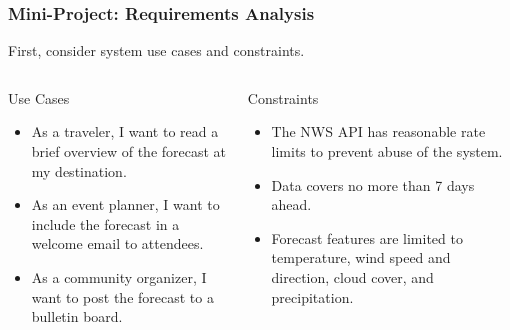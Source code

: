 \begin{frame}
\frametitle{Mini-Project: Requirements Analysis}

First, consider system use cases and constraints.

\vspace{24pt}

\begin{columns}

	\begin{column}{0.5\textwidth}
		Use Cases
		
		\begin{itemize}
			
			\item As a traveler, I want to read a brief overview
			of the forecast at my destination.
			
			\item As an event planner, I want to include
			the forecast in a welcome email to attendees.
			
			\item As a community organizer, I want to post
			the forecast to a bulletin board.
			
		\end{itemize}
		
	\end{column}
	
	\begin{column}{0.5\textwidth}
		Constraints
		
		\begin{itemize}
		
			\item The NWS API has reasonable rate limits
			to prevent abuse of the system.
			
			\item Data covers no more than 7 days ahead.
			
			\item Forecast features are limited to temperature, wind speed
			and direction, cloud cover, and precipitation.
		
		\end{itemize}
		
	\end{column}

\end{columns}

\end{frame}